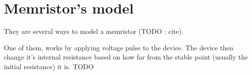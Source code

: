 \section{Memristor's model}\label{sec:model}
They are several ways to model a memristor (TODO : cite).

One of them, works by applying voltage pulse to the device. The device then change it's internal resistance based on how far from the stable point (usually the initial resistance) it is.
TODO
